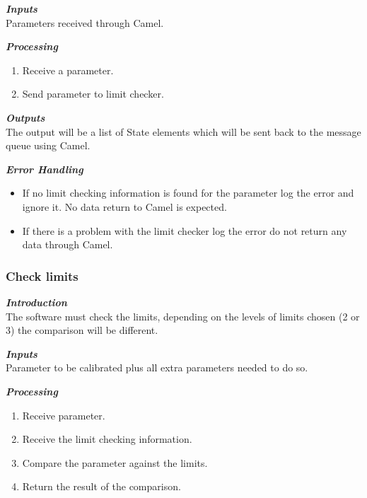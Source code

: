 \textbf{\emph{Inputs}}\\

Parameters received through Camel.

\textbf{\emph{Processing}}\\
\begin{enumerate}
\item Receive a parameter.
\item Send parameter to limit checker.
\end{enumerate}

\textbf{\emph{Outputs}}\\

The output will be a list of State elements which will be sent back to the message queue using Camel.


\textbf{\emph{Error Handling}}\\
\begin{itemize}
\item If no limit checking information is found for the parameter log the error and ignore it. No data return to Camel is expected.
\item If there is a problem with the limit checker log the error do not return any data through Camel.
\end{itemize}


\subsubsection{Check limits}

\textbf{\emph{Introduction}}\\

The software must check the limits, depending on the levels of limits chosen (2 or 3) the comparison will be different.


\textbf{\emph{Inputs}}\\

Parameter to be calibrated plus all extra parameters needed to do so.

\textbf{\emph{Processing}}\\
\begin{enumerate}
\item Receive parameter.
\item Receive the limit checking information.
\item Compare the parameter against the limits.
\item Return the result of the comparison.
\end{enumerate}

